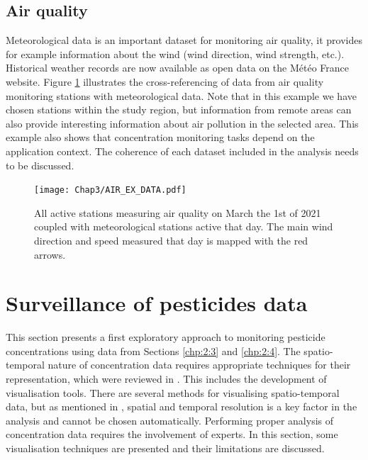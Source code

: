 \subsection{Air quality}
Meteorological data is an important dataset for monitoring air quality, it provides for example information about the wind (wind direction, wind strength, etc.). Historical weather records are now available as open data on the Météo France \cite{SYNOP} website. Figure \ref{fig:air_ex} illustrates the cross-referencing of data from air quality monitoring stations with meteorological data. Note that in this example we have chosen stations within the study region, but information from remote areas can also provide interesting information about air pollution in the selected area. This example also shows that concentration monitoring tasks depend on the application context. The coherence of each dataset included in the analysis needs to be discussed.

\begin{figure}[ht]
    \centering
    \texttt{[image: Chap3/AIR\_EX\_DATA.pdf]}
    \caption{All active stations measuring air quality on March the 1st of 2021 coupled with meteorological stations active that day. The main wind direction and speed measured that day is mapped with the red arrows.}
    \label{fig:air_ex}
\end{figure}

\section{Surveillance of pesticides data}\label{chp:2:5}

This section presents a first exploratory approach to monitoring pesticide concentrations using data from Sections \ref{chp:2:3} and \ref{chp:2:4}. The spatio-temporal nature of concentration data requires appropriate techniques for their representation, which were reviewed in \cite{Andrienko2003,cressie2015,Maimon2010}. This includes the development of visualisation tools. There are several methods for visualising spatio-temporal data, but as mentioned in \cite{Ansari2019}, spatial and temporal resolution is a key factor in the analysis and cannot be chosen automatically. Performing proper analysis of concentration data requires the involvement of experts. In this section, some visualisation techniques are presented and their limitations are discussed. 

